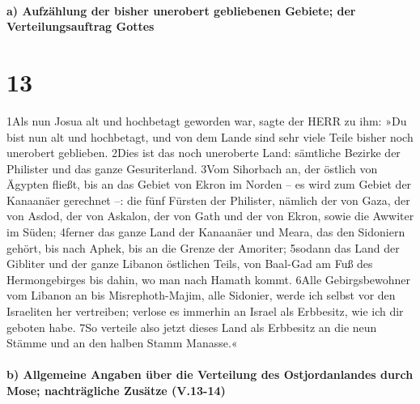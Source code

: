 \hypertarget{a-aufzuxe4hlung-der-bisher-unerobert-gebliebenen-gebiete-der-verteilungsauftrag-gottes}{%
\paragraph{a) Aufzählung der bisher unerobert gebliebenen Gebiete; der
Verteilungsauftrag
Gottes}\label{a-aufzuxe4hlung-der-bisher-unerobert-gebliebenen-gebiete-der-verteilungsauftrag-gottes}}

\hypertarget{section-12}{%
\section{13}\label{section-12}}

1Als nun Josua alt und hochbetagt geworden war, sagte der HERR zu ihm:
»Du bist nun alt und hochbetagt, und von dem Lande sind sehr viele Teile
bisher noch unerobert geblieben. 2Dies ist das noch uneroberte Land:
sämtliche Bezirke der Philister und das ganze Gesuriterland. 3Vom
Sihorbach an, der östlich von Ägypten fließt, bis an das Gebiet von
Ekron im Norden -- es wird zum Gebiet der Kanaanäer gerechnet --: die
fünf Fürsten der Philister, nämlich der von Gaza, der von Asdod, der von
Askalon, der von Gath und der von Ekron, sowie die Awwiter im Süden;
4ferner das ganze Land der Kanaanäer und Meara, das den Sidoniern
gehört, bis nach Aphek, bis an die Grenze der Amoriter; 5sodann das Land
der Gibliter und der ganze Libanon östlichen Teils, von Baal-Gad am Fuß
des Hermongebirges bis dahin, wo man nach Hamath kommt. 6Alle
Gebirgsbewohner vom Libanon an bis Misrephoth-Majim, alle Sidonier,
werde ich selbst vor den Israeliten her vertreiben; verlose es immerhin
an Israel als Erbbesitz, wie ich dir geboten habe. 7So verteile also
jetzt dieses Land als Erbbesitz an die neun Stämme und an den halben
Stamm Manasse.«

\hypertarget{b-allgemeine-angaben-uxfcber-die-verteilung-des-ostjordanlandes-durch-mose-nachtruxe4gliche-zusuxe4tze-v.13-14}{%
\paragraph{b) Allgemeine Angaben über die Verteilung des Ostjordanlandes
durch Mose; nachträgliche Zusätze
(V.13-14)}\label{b-allgemeine-angaben-uxfcber-die-verteilung-des-ostjordanlandes-durch-mose-nachtruxe4gliche-zusuxe4tze-v.13-14}}

